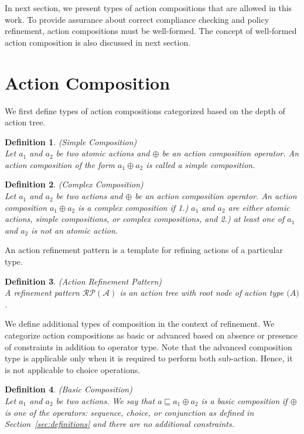 \documentclass[12pt,journal,letterpaper,onecolumn]{IEEEtran}
\newtheorem{definition}{Definition}[section]
\begin{document}
In next section, we present types of action compositions that are
allowed in this work. To provide assurance about correct compliance
checking and policy refinement, action compositions must be
well-formed. The concept of well-formed action composition is also
discussed in next section.

\section{Action Composition}
\label{sec:composition} We first define types of action compositions
categorized based on the depth of action tree.

\begin{definition}(Simple Composition)\\
Let $a_1$ and $a_2$ be two atomic actions and $\oplus$ be an action
composition operator. An action composition of the form $a_1 \oplus
a_2$ is called a simple composition. \label{def:simple}
\end{definition}

\begin{definition}(Complex Composition)\\
Let $a_1$ and $a_2$ be two actions and $\oplus$ be an action
composition operator. An action composition $a_1 \oplus a_2$ is a
complex composition if 1.) $a_1$ and $a_2$ are either
 atomic actions, simple compositions, or complex compositions, and
 2.) at least one of $a_1$ and $a_2$ is not an atomic action.
\end{definition}

An action refinement pattern is a template for refining actions of a
particular type.

\begin{definition}(Action Refinement Pattern)\\
A refinement pattern $\mathcal{RP(A)}$ is an action tree with root
node of action type $\mathcal(A)$.
\end{definition}

We define additional types of composition in the context of
refinement. We categorize action compositions as basic or
advanced based on absence or presence of constraints in addition to
operator type. Note that the advanced composition type is applicable
only when it is required to perform both sub-action. Hence, it is
not applicable to choice operations.

\begin{definition}(Basic Composition)\\
\label{def:basic} Let $a_1$ and $a_2$ be two actions. We say that
$a\sqsubseteq a_1 \oplus a_2$ is a basic composition if $\oplus$ is
one of the
 operators: sequence, choice, or conjunction as defined in
Section~\ref{sec:definitions} and there are no additional
constraints.
\end{definition}
\end{document}
